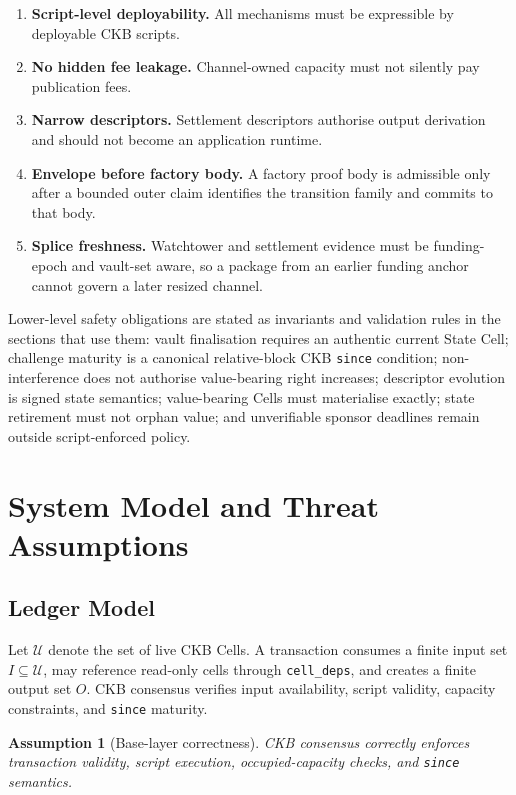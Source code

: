 \documentclass[a4paper,11pt]{article}
\newtheorem{assumption}{Assumption}
\newcommand{\Cells}{\mathcal{U}}
\begin{document}
\begin{enumerate}[label=P\arabic*.]
  \item \textbf{Script-level deployability.} All mechanisms must be expressible by deployable CKB scripts.
  \item \textbf{No hidden fee leakage.} Channel-owned capacity must not silently pay publication fees.
  \item \textbf{Narrow descriptors.} Settlement descriptors authorise output derivation and should not become an application runtime.
  \item \textbf{Envelope before factory body.} A factory proof body is admissible only after a bounded outer claim identifies the transition family and commits to that body.
  \item \textbf{Splice freshness.} Watchtower and settlement evidence must be funding-epoch and vault-set aware, so a package from an earlier funding anchor cannot govern a later resized channel.
\end{enumerate}

Lower-level safety obligations are stated as invariants and validation rules in
the sections that use them: vault finalisation requires an authentic current
State Cell; challenge maturity is a canonical relative-block CKB
\texttt{since} condition; non-interference does not authorise value-bearing
right increases; descriptor evolution is signed state semantics; value-bearing
Cells must materialise exactly; state retirement must not orphan value; and
unverifiable sponsor deadlines remain outside script-enforced policy.

\clearpage
\section{System Model and Threat Assumptions}

\subsection{Ledger Model}

Let $\Cells$ denote the set of live CKB Cells. A transaction consumes a finite input set $I\subseteq\Cells$, may reference read-only cells through \texttt{cell\_deps}, and creates a finite output set $O$. CKB consensus verifies input availability, script validity, capacity constraints, and \texttt{since} maturity.

\begin{assumption}[Base-layer correctness]
CKB consensus correctly enforces transaction validity, script execution, occupied-capacity checks, and \texttt{since} semantics.
\end{assumption}
\end{document}
